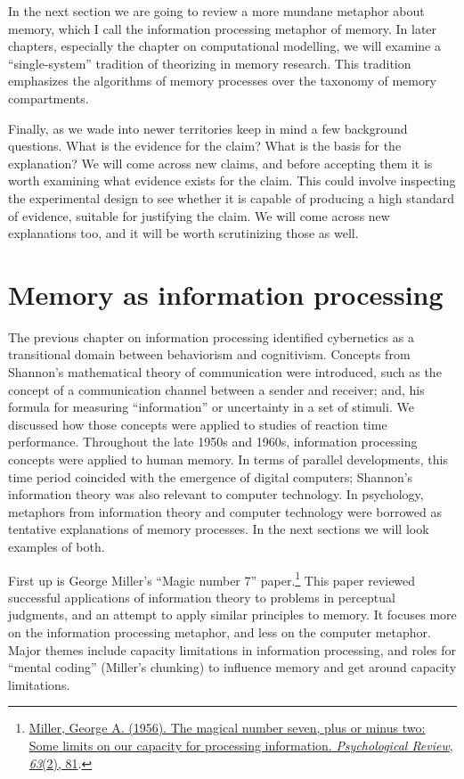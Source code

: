 \documentclass[
  oneside,
  12pt]{crumpbook}
\begin{document}
In the next section we are going to review a more mundane metaphor about memory, which I call the information processing metaphor of memory. In later chapters, especially the chapter on computational modelling, we will examine a ``single-system'' tradition of theorizing in memory research. This tradition emphasizes the algorithms of memory processes over the taxonomy of memory compartments.

Finally, as we wade into newer territories keep in mind a few background questions. What is the evidence for the claim? What is the basis for the explanation? We will come across new claims, and before accepting them it is worth examining what evidence exists for the claim. This could involve inspecting the experimental design to see whether it is capable of producing a high standard of evidence, suitable for justifying the claim. We will come across new explanations too, and it will be worth scrutinizing those as well.

\hypertarget{memory-as-information-processing}{%
\section{Memory as information processing}\label{memory-as-information-processing}}

The previous chapter on information processing identified cybernetics as a transitional domain between behaviorism and cognitivism. Concepts from Shannon's mathematical theory of communication were introduced, such as the concept of a communication channel between a sender and receiver; and, his formula for measuring ``information'' or uncertainty in a set of stimuli. We discussed how those concepts were applied to studies of reaction time performance. Throughout the late 1950s and 1960s, information processing concepts were applied to human memory. In terms of parallel developments, this time period coincided with the emergence of digital computers; Shannon's information theory was also relevant to computer technology. In psychology, metaphors from information theory and computer technology were borrowed as tentative explanations of memory processes. In the next sections we will look examples of both.

First up is George Miller's ``Magic number 7'' paper.\footnote{\protect\hyperlink{ref-millerMagicalNumberSeven1956}{Miller, George A. (1956). The magical number seven, plus or minus two: {Some} limits on our capacity for processing information. \emph{Psychological Review}, \emph{63}(2), 81}.} This paper reviewed successful applications of information theory to problems in perceptual judgments, and an attempt to apply similar principles to memory. It focuses more on the information processing metaphor, and less on the computer metaphor. Major themes include capacity limitations in information processing, and roles for ``mental coding'' (Miller's chunking) to influence memory and get around capacity limitations.
\end{document}
